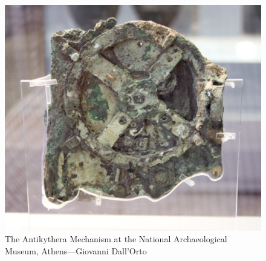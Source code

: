 \begin{figure}
\centering
\includegraphics[width=5in]{antikythera_photo.jpg}
\caption{The Antikythera Mechanism at the National Archaeological Museum, Athens---Giovanni Dall'Orto}
\label{atikytheraphoto1}
\end{figure}

